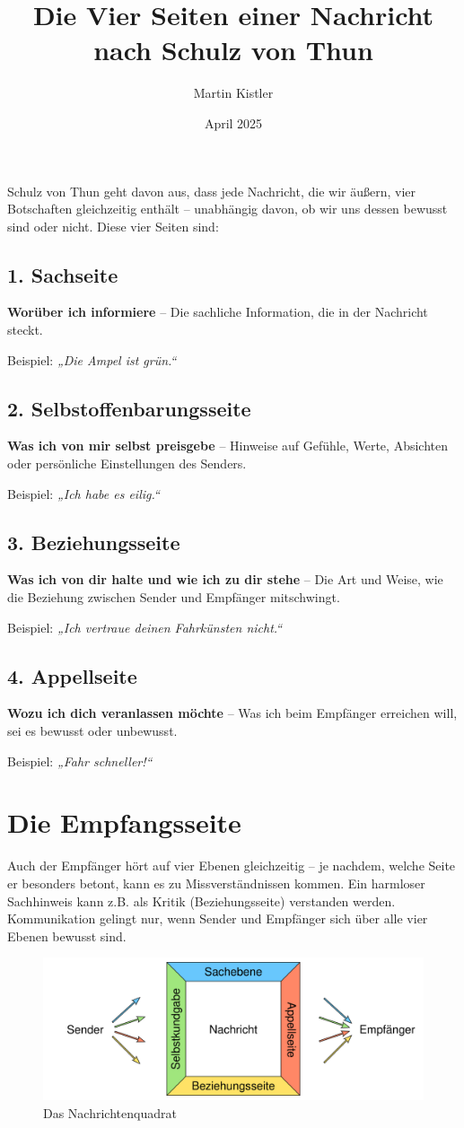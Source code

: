 \documentclass{article}
\title{\textbf{Die Vier Seiten einer Nachricht}\\nach Schulz von Thun}
\author{Martin Kistler}
\date{April 2025}
\begin{document}
\maketitle
\thispagestyle{empty}
Schulz von Thun geht davon aus, dass jede Nachricht, die wir äußern, vier Botschaften gleichzeitig enthält – unabhängig davon, ob wir uns dessen bewusst sind oder nicht. Diese vier Seiten sind:

\subsection{1. Sachseite}
\textbf{Worüber ich informiere} – Die sachliche Information, die in der Nachricht steckt.

\vspace{0.2cm}
Beispiel: \textit{„Die Ampel ist grün.“}  

\subsection{2. Selbstoffenbarungsseite}
\textbf{Was ich von mir selbst preisgebe} – Hinweise auf Gefühle, Werte, Absichten oder persönliche Einstellungen des Senders.

\vspace{0.2cm}
Beispiel: \textit{„Ich habe es eilig.“}

\subsection{3. Beziehungsseite}
\textbf{Was ich von dir halte und wie ich zu dir stehe} – Die Art und Weise, wie die Beziehung zwischen Sender und Empfänger mitschwingt.

\vspace{0.2cm}
Beispiel: \textit{„Ich vertraue deinen Fahrkünsten nicht.“}

\subsection{4. Appellseite}
\textbf{Wozu ich dich veranlassen möchte} – Was ich beim Empfänger erreichen will, sei es bewusst oder unbewusst.

\vspace{0.2cm}
Beispiel: \textit{„Fahr schneller!“}

\section{Die Empfangsseite}
Auch der Empfänger hört auf vier Ebenen gleichzeitig – je nachdem, welche Seite er besonders betont, kann es zu Missverständnissen kommen. Ein harmloser Sachhinweis kann z.B. als Kritik (Beziehungsseite) verstanden werden. Kommunikation gelingt nur, wenn Sender und Empfänger sich über alle vier Ebenen bewusst sind.

\vspace{1cm}
\begin{figure}[h]
    \centering
    \includegraphics[width=0.25\linewidth]{nachrichtenquadrat.png}
    \caption{Das Nachrichtenquadrat}
    \label{fig:Nachrichtenquadrat}
\end{figure}
\end{document}
